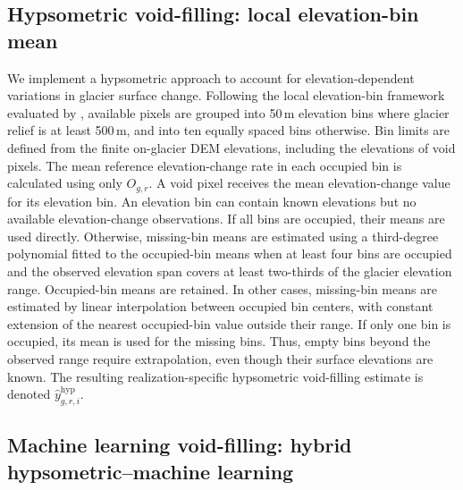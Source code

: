 \documentclass[tc,manuscript]{copernicus}
\begin{document}
\subsection{Hypsometric void-filling: local elevation-bin mean}
We implement a hypsometric approach to account for elevation-dependent variations in glacier surface change. Following the local elevation-bin framework evaluated by \citet{mcnabb2019}, available pixels are grouped into 50\,m elevation bins where glacier relief is at least 500\,m, and into ten equally spaced bins otherwise. Bin limits are defined from the finite on-glacier DEM elevations, including the elevations of void pixels. The mean reference elevation-change rate in each occupied bin is calculated using only $O_{g,r}$. A void pixel receives the mean elevation-change value for its elevation bin.
An elevation bin can contain known elevations but no available elevation-change observations. If all bins are occupied, their means are used directly. Otherwise, missing-bin means are estimated using a third-degree polynomial fitted to the occupied-bin means when at least four bins are occupied and the observed elevation span covers at least two-thirds of the glacier elevation range. Occupied-bin means are retained. In other cases, missing-bin means are estimated by linear interpolation between occupied bin centers, with constant extension of the nearest occupied-bin value outside their range. If only one bin is occupied, its mean is used for the missing bins. Thus, empty bins beyond the observed range require extrapolation, even though their surface elevations are known. The resulting realization-specific hypsometric void-filling estimate is denoted $\widehat y^{\mathrm{hyp}}_{g,r,i}$.


\subsection{Machine learning void-filling: hybrid hypsometric--machine learning}
\end{document}
